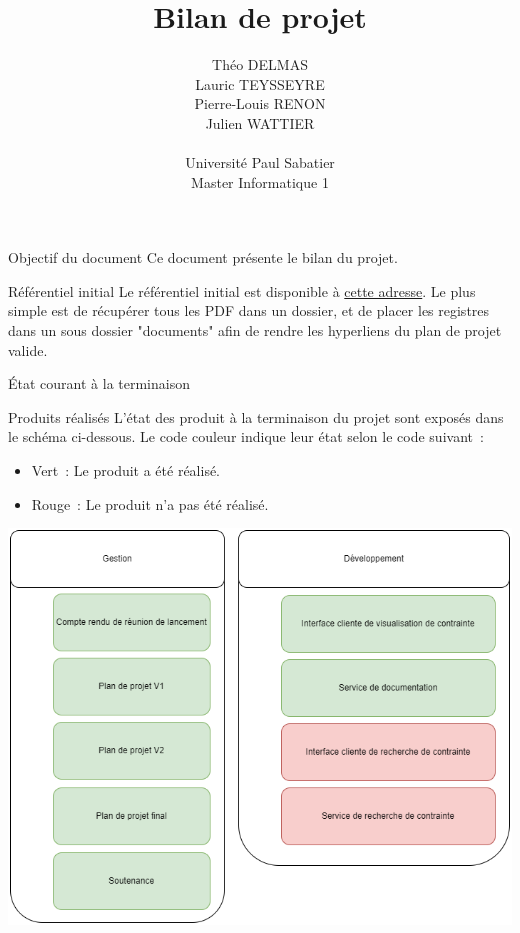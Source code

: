 \documentclass[]{article}
\title{Bilan de projet}
\author{
    Théo DELMAS\\
    Lauric TEYSSEYRE\\
    Pierre-Louis RENON\\
    Julien WATTIER\\
    \\
    Université Paul Sabatier\\
    Master Informatique 1\\
   }
\begin{document}
\maketitle
\newpage
\tableofcontents
\newpage

\begin{section}{Objectif du document}
 Ce document présente le bilan du projet.
\end{section}

{
\setlength{\parindent}{0pt} %
\begin{section}{Référentiel initial}
 Le référentiel initial est disponible à \href{https://github.com/Szyckaa/UE-PROJET-DOCS-GESTION/releases/tag/2.0.0}{cette adresse}.
 Le plus simple est de récupérer tous les PDF dans un dossier, et de placer les registres dans un sous dossier "documents" afin de rendre les hyperliens du plan de projet valide.
\end{section}

\begin{section}{État courant à la terminaison}
 \begin{subsection}{Produits réalisés}
     L’état des produit à la terminaison du projet sont exposés dans le schéma ci-dessous. Le code couleur indique leur état selon le code suivant :

     \begin{itemize}
         \item Vert : Le produit a été réalisé.
         \item Rouge : Le produit n’a pas été réalisé.
     \end{itemize}

     \includegraphics[scale=0.49]{IMG/PBS_final}


\end{subsection}
\end{section}}
\end{document}
